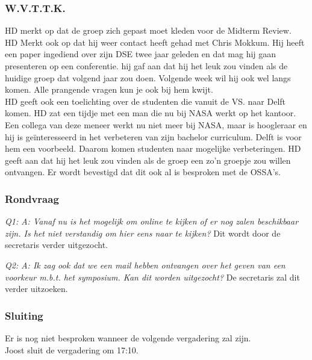 \subsubsection{W.V.T.T.K.}
HD merkt op dat de groep zich gepast moet kleden voor de Midterm Review.\\

HD Merkt ook op dat hij weer contact heeft gehad met Chris Mokkum. Hij heeft een paper ingediend over zijn DSE twee jaar geleden en dat mag hij gaan presenteren op een conferentie. hij gaf aan dat hij het leuk zou vinden als de huidige groep dat volgend jaar zou doen. Volgende week wil hij ook wel langs komen. Alle prangende vragen kun je ook bij hem kwijt.\\

HD geeft ook een toelichting over de studenten die vanuit de VS. naar Delft komen. HD zat een tijdje met een man die nu bij NASA werkt op het kantoor. Een collega van deze meneer werkt nu niet meer bij NASA, maar is hoogleraar en hij is geïnteresseerd in het verbeteren van zijn bachelor curriculum. Delft is voor hem een voorbeeld. Daarom komen studenten naar mogelijke verbeteringen. HD geeft aan dat hij het leuk zou vinden als de groep een zo'n groepje zou willen ontvangen. Er wordt bevestigd dat dit ook al is besproken met de OSSA's.\\

\subsubsection{Rondvraag}
\textit{Q1: A: Vanaf nu is het mogelijk om online te kijken of er nog zalen beschikbaar zijn. Is het niet verstandig om hier eens naar te kijken?}
Dit wordt door de secretaris verder uitgezocht.

\textit{Q2: A: Ik zag ook dat we een mail hebben ontvangen over het geven van een voorkeur m.b.t. het symposium. Kan dit worden uitgezocht?}
De secretaris zal dit verder uitzoeken.


\subsubsection{Sluiting}
Er is nog niet besproken wanneer de volgende vergadering zal zijn.\\

Joost sluit de vergadering om 17:10.\\


